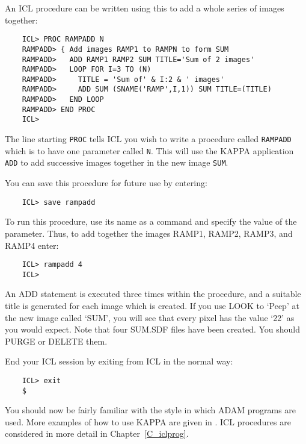 An ICL procedure can be written using this to add a whole series of images
together:

\begin{small}
\begin{verbatim}
    ICL> PROC RAMPADD N
    RAMPADD> { Add images RAMP1 to RAMPN to form SUM
    RAMPADD>   ADD RAMP1 RAMP2 SUM TITLE='Sum of 2 images'
    RAMPADD>   LOOP FOR I=3 TO (N)
    RAMPADD>     TITLE = 'Sum of' & I:2 & ' images'
    RAMPADD>     ADD SUM (SNAME('RAMP',I,1)) SUM TITLE=(TITLE)
    RAMPADD>   END LOOP
    RAMPADD> END PROC
    ICL>
\end{verbatim}
\end{small}

The line starting \verb+PROC+ tells ICL you wish to write a procedure called
\verb+RAMPADD+ which is to have one parameter called \verb+N+. 
This will use the KAPPA application \verb+ADD+ to 
add successive
images together in the new image \verb+SUM+.

You can save this procedure for future use by entering:

\begin{small}
\begin{verbatim}
    ICL> save rampadd
\end{verbatim}
\end{small}

To run this procedure, use its name as a command and specify the value of the
parameter.
Thus, to add together the images RAMP1, RAMP2, RAMP3, and RAMP4 enter:

\begin{small}
\begin{verbatim}
    ICL> rampadd 4
    ICL>
\end{verbatim}
\end{small}

An ADD statement is executed three times within the procedure, and a suitable
title is generated for each image which is created.
If you use LOOK to `Peep' at the new image called `SUM', you will see that
every pixel has the value `22' as you would expect. 
Note that four SUM.SDF files have been created.
You should PURGE or DELETE them.

End your ICL session by exiting from ICL in the normal way:

\begin{small}
\begin{verbatim}
    ICL> exit
    $
\end{verbatim}
\end{small}

You should now be fairly familiar with the style in which ADAM programs are
used.
More examples of how to use KAPPA are given in
.
ICL procedures are considered in more detail in Chapter~\ref{C_iclprog}.
